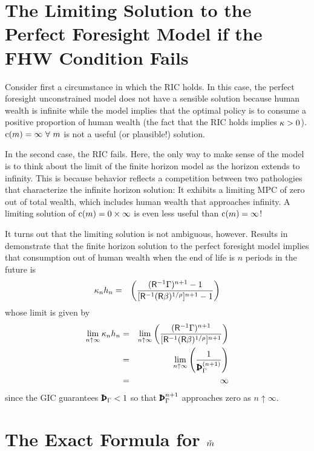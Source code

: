 \message{ !name(TractableBufferStock.tex)}\documentclass{handout}
\begin{document}
\section{The Limiting Solution to the Perfect Foresight Model if the FHW Condition Fails}\label{sec:PFwhenFHWfails}

Consider first a circumstance in which the RIC holds.  In this case, the perfect foresight unconstrained model does not have a sensible solution because human wealth is infinite while the model implies that the optimal policy is to consume a positive proportion of human wealth (the fact that the RIC holds implies $\kappa > 0$).  $\mathrm{c}(m)=\infty~\forall~m$ is not a useful (or plausible!) solution.

In the second case, the RIC fails.  Here, the only way to make sense of the model is to think about the limit of the finite horizon model as the horizon extends to infinity.  This is because behavior reflects a competition between two pathologies that characterize the infinite horizon solution:  It exhibits a limiting MPC of zero out of total wealth, which includes human wealth that approaches infinity.  A limiting solution of $\mathrm{c}(m) = 0 \times \infty$ is even less useful than $\mathrm{c}(m) = \infty$!  

It turns out that the limiting solution is not ambiguous, however.  Results in  demonstrate that the finite horizon solution to the perfect foresight model implies that consumption out of human wealth when the end of life is $n$ periods in the future is 
\begin{eqnarray}
  \kappa_{n} h_{n} & = & \left(\frac{(\mathsf{R}^{-1}{\Gamma})^{{n}+1}-1}{[\mathsf{R}^{-1}(\mathsf{R}\beta)^{1/\rho}]^{{n}+1}-1}\right) 
\end{eqnarray}
whose limit is given by 
\begin{eqnarray}
\lim_{{n} \uparrow \infty} \MPC_{n} \hRat_{n} & = & \lim_{n \uparrow \infty} \left(\frac{(\Rfree^{-1}{\PGro})^{{n}+1}}{[\Rfree^{-1}(\Rfree\Discount)^{1/\CRRA}]^{{n}+1}}\right)
\\ & = & \lim_{n \uparrow \infty} \left(\frac{1}{\PatPGro^{(n+1)}}\right)
\\ & = & \infty
\end{eqnarray}
since the GIC guarantees $\PatPGro < 1$ so that $\PatPGro^{n+1}$ approaches zero as $n \uparrow \infty.$

\section{The Exact Formula for $\mTarg^{\null}$}\label{sec:mTargExact}
\end{document}
